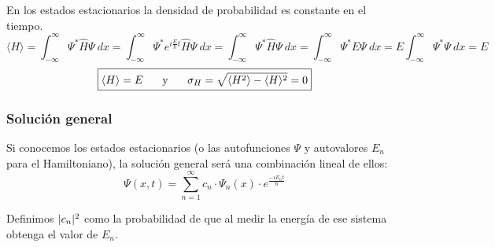 \documentclass{report}
\begin{document}
    \noindent En los estados estacionarios la densidad de probabilidad es constante
    en el tiempo. 
    \[\langle H\rangle=\int_{-\infty}^{\infty}\Psi^*\hat{H}\Psi\ dx=
    \int_{-\infty}^{\infty}\Psi^*e^{i\frac{E}{\hbar}t}\hat{H}\Psi\ dx=
    \int_{-\infty}^{\infty}\Psi^*\hat{H}\Psi\ dx=
    \int_{-\infty}^{\infty}\Psi^* E\Psi\ dx=E\int_{-\infty}^{\infty}\Psi^*\Psi\ dx=E\]
    \[\boxed{\langle H\rangle=E\hspace{0.5cm}\text{ y }\hspace{0.5cm}
    \sigma_H=\sqrt{\langle H^2\rangle-\langle H\rangle^2}=0}\]

    \subsubsection{Solución general}
      \noindent Si conocemos los estados estacionarios (o las autofunciones $\Psi$ y autovalores 
      $E_n$ para el Hamiltoniano), la solución general será una combinación lineal de ellos:
      \[\Psi(x,t)=\sum_{n=1}^{\infty}c_n\cdot\Psi_n(x)\cdot e^{\frac{-iE_nt}{\hbar}}\]

      \noindent Definimos $\lvert c_n\rvert^2$ como la probabilidad de que al medir la energía de ese
      sistema obtenga el valor de $E_n$.

\end{document}
